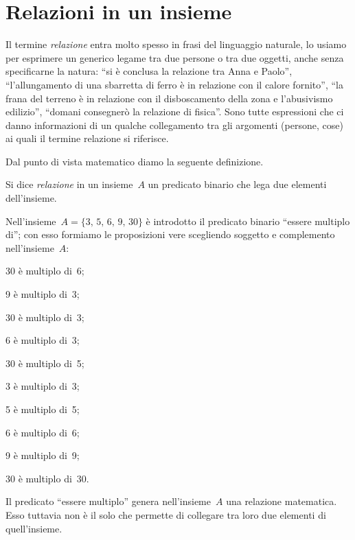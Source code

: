 \ovalbox{\risolvi \ref{ese:B.1}}

\section{Relazioni in un insieme}

Il termine \emph{relazione} entra molto spesso in frasi del linguaggio naturale, lo usiamo per esprimere un generico legame tra due persone o tra due oggetti,
anche senza specificarne la natura: ``si è conclusa la relazione tra Anna e Paolo'', ``l'allungamento di una sbarretta di ferro è in relazione con il calore fornito'',
``la frana del terreno è in relazione con il disboscamento della zona e l'abusivismo edilizio'', ``domani consegnerò la relazione di fisica''.
Sono tutte espressioni che ci danno informazioni di un qualche collegamento tra gli
argomenti (persone, cose) ai quali il termine relazione si riferisce.

Dal punto di vista matematico diamo la seguente definizione.
\begin{definizione}
Si dice \emph{relazione} in un insieme~$A$ un predicato binario che lega due elementi dell'insieme.
\end{definizione}

\begin{exrig}
 \begin{esempio}
 Nell'insieme~$A = \{3\text{,~}5\text{,~}6\text{,~}9\text{,~}30\}$ è introdotto il predicato binario ``essere multiplo di''; con esso formiamo le proposizioni vere scegliendo soggetto e
 complemento nell'insieme~$A$:

\begin{multicols}{3}
30 è multiplo di~6;

9 è multiplo di~3;

30 è multiplo di~3;

6 è multiplo di~3;

30 è multiplo di~5;

3 è multiplo di~3;

5 è multiplo di~5;

6 è multiplo di~6;

9 è multiplo di~9;

30 è multiplo di~30.
\end{multicols}
Il predicato ``essere multiplo'' genera nell'insieme~$A$ una relazione matematica. Esso tuttavia non è il
solo che permette di collegare tra loro due elementi di quell'insieme.
\end{esempio}
\end{exrig}

